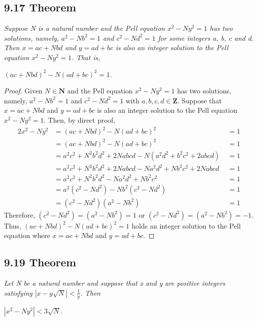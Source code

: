 \documentclass{article}
\begin{document}
\subsection*{9.17 Theorem} 
\quad \textit{Suppose N is a natural number and the Pell equation $x^2-Ny^2=1$ has two solutions, namely, $a^2-Nb^2=1$ and $c^2-Nd^2 = 1$ for some integers a, b, c and d. Then $x = ac + Nbd$ and $y = ad + bc$ is also an integer solution to the Pell equation $x^2-Ny^2=1$. That is,}
\begin{center}
    $(ac + Nbd)^2 - N(ad + bc)^2 = 1$.
\end{center}

\begin{proof}
Given $N \in \mathbf{N}$ and the Pell equation $x^2-Ny^2=1$ has two solutions, namely, $a^2-Nb^2=1$ and $c^2-Nd^2 = 1$ with $a, b, c, d \in \mathbf{Z}$. Suppose that $x = ac + Nbd$ and $y = ad + bc$ is also an integer solution to the Pell equation $x^2-Ny^2=1$. Then, by direct proof,
\begin{alignat*}{2}
    x^2 - Ny^2 &= (ac + Nbd)^2 - N(ad + bc)^2 \;&= 1\\
               &= (ac + Nbd)^2 - N(ad + bc)^2 \;&= 1\\
               &= a^2c^2 + N^2b^2d^2 + 2Nabcd - N(a^2d^2 + b^2c^2 + 2abcd) \;&= 1\\
               &= a^2c^2 + N^2b^2d^2 + 2Nabcd - Na^2d^2 + Nb^2c^2 + 2Nabcd \;&= 1\\
               &= a^2c^2 + N^2b^2d^2 - Na^2d^2 + Nb^2c^2 \;&= 1\\
               &= a^2(c^2-Nd^2) - Nb^2(c^2-Nd^2) \;&= 1\\
               &= (c^2-Nd^2)(a^2 - Nb^2) \;&= 1
\end{alignat*}
Therefore, $(c^2-Nd^2) = (a^2 - Nb^2) = 1$ or $(c^2-Nd^2) = (a^2 - Nb^2) = -1$. Thus, $(ac + Nbd)^2 - N(ad + bc)^2 = 1$ holds an integer solution to the Pell equation where $x = ac + Nbd$ and $y = ad + bc$.
\end{proof}

\subsection*{9.19 Theorem} 
\quad \textit{Let N be a natural number and suppose that x and y are positive integers satisfying $|x-y\sqrt{N}| < \frac{1}{y}$. Then}
\begin{center}
    $|x^2 - Ny^2| < 3\sqrt{N}$.
\end{center}
\end{document}
